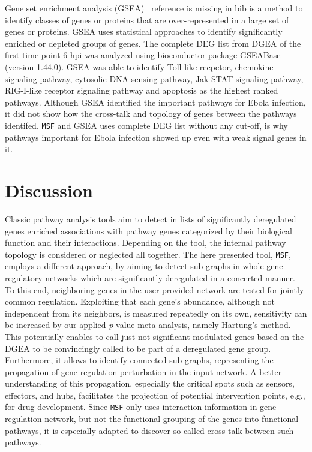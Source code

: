 \documentclass[10pt,a4paper,twocolumn]{article}
\newcommand{\FA}[1]{\begingroup\color{magenta}#1\endgroup}
\newcommand{\TODO}[1]{\begingroup\color{red}#1\endgroup}
\begin{document}
	Gene set enrichment analysis (GSEA)~\cite{Subramanian15545}
        \TODO{reference is missing in bib} is a method to identify
        classes of genes or proteins that are over-represented in a
        large set of genes or proteins. GSEA uses statistical
        approaches to identify significantly enriched or depleted
        groups of genes. The complete DEG list from DGEA of the first
        time-point 6 hpi was analyzed using bioconductor package
        GSEABase (version 1.44.0). GSEA was able to identify
        Toll\FA{-}like recpetor, chemokine signaling pathway,
        cytosolic DNA-sensing pathway, Jak-STAT signaling pathway,
        RIG-I-like receptor signaling pathway and apoptosis as the
        highest ranked pathways. Although GSEA identified the
        important pathways for Ebola infection, it did not show how
        the cross-talk and topology of genes between the pathways
        identifed. \texttt{MSF} and GSEA uses complete DEG list
        without any cut-off, is why pathways important for Ebola
        infection showed up even with weak signal genes in it.
	
	\section*{Discussion}
	
	Classic pathway analysis tools aim to detect in lists of
        significantly deregulated genes enriched associations with
        pathway genes categorized by their biological function and
        their interactions. Depending on the tool, the internal
        pathway topology is considered or neglected all together. The
        here presented tool, \texttt{MSF}, employs a different
        approach, by aiming to detect sub-graphs in whole gene
        regulatory networks which are significantly deregulated in a
        concerted manner. To this end, neighboring genes in the user
        provided network are tested for jointly common
        regulation. Exploiting that each gene's abundance, although
        not independent from its neighbors, is measured repeatedly on
        its own, sensitivity can be increased by our applied
        \textit{p}-value meta-analysis, namely Hartung's method. This
        potentially enables to call just not significant modulated
        genes based on the DGEA to be convincingly called to be part
        of a deregulated gene group.  Furthermore, it allows to
        identify connected sub-graphs, representing the propagation of
        gene regulation perturbation in the input network. A better
        understanding of this propagation, especially the critical
        spots such as sensors, effectors, and hubs, facilitates the
        projection of potential intervention points, e.g., for drug
        development. Since \texttt{MSF} only uses interaction
        information in gene regulation network, but not the functional
        grouping of the genes into functional pathways, it is
        especially adapted to discover so called cross-talk between
        such pathways.
	
\end{document}
